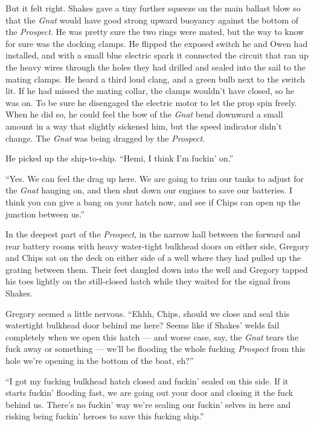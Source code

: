 \documentclass[]{scrbook}
\begin{document}
But it felt right. Shakes gave a tiny further squeeze on the main
ballast blow so that the \emph{Gnat} would have good strong upward
buoyancy against the bottom of the \emph{Prospect}. He was pretty sure
the two rings were mated, but the way to know for sure was the docking
clamps. He flipped the exposed switch he and Owen had installed, and
with a small blue electric spark it connected the circuit that ran up
the heavy wires through the holes they had drilled and sealed into the
sail to the mating clamps. He heard a third loud clang, and a green bulb
next to the switch lit. If he had missed the mating collar, the clamps
wouldn't have closed, so he was on. To be sure he disengaged the
electric motor to let the prop spin freely. When he did so, he could
feel the bow of the \emph{Gnat} bend downward a small amount in a way
that slightly sickened him, but the speed indicator didn't change. The
\emph{Gnat} was being dragged by the \emph{Prospect}.

He picked up the ship-to-ship. ``Hemi, I think I'm fuckin' on.''

``Yes. We can feel the drag up here. We are going to trim our tanks to
adjust for the \emph{Gnat} hanging on, and then shut down our engines to
save our batteries. I think you can give a bang on your hatch now, and
see if Chips can open up the junction between us.''

In the deepest part of the \emph{Prospect}, in the narrow hall between
the forward and rear battery rooms with heavy water-tight bulkhead doors
on either side, Gregory and Chips sat on the deck on either side of a
well where they had pulled up the grating between them. Their feet
dangled down into the well and Gregory tapped his toes lightly on the
still-closed hatch while they waited for the signal from Shakes.

Gregory seemed a little nervous. ``Ehhh, Chips, should we close and seal
this watertight bulkhead door behind me here? Seems like if Shakes'
welds fail completely when we open this hatch --- and worse case, say,
the \emph{Gnat} tears the fuck away or something --- we'll be flooding
the whole fucking \emph{Prospect} from this hole we're opening in the
bottom of the boat, eh?''

``I got my fucking bulkhead hatch closed and fuckin' sealed on this
side. If it starts fuckin' flooding fast, we are going out your door and
closing it the fuck behind us. There's no fuckin' way we're sealing our
fuckin' selves in here and risking being fuckin' heroes to save this
fucking ship.''
\end{document}

